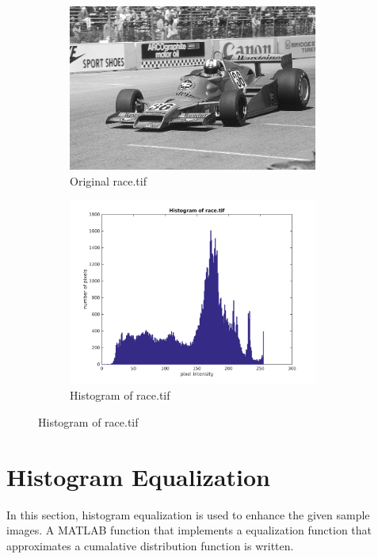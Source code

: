 \documentclass{article}
\begin{document}
	\begin{figure}[h]
		\begin{subfigure}{0.5\textwidth}
			\includegraphics[width=0.9\textwidth]{race.png}
			\caption{Original race.tif}
		\end{subfigure}
		\begin{subfigure}{0.5\textwidth}
			\includegraphics[width=0.9\textwidth]{race_hist.png}
			\caption{Histogram of race.tif}
		\end{subfigure}
	\end{figure}

\pagebreak

\section{Histogram Equalization}
	In this section, histogram equalization is used to enhance the given sample
	images. A MATLAB function that implements a equalization function that
	approximates a cumalative distribution function is written.
\end{document}
